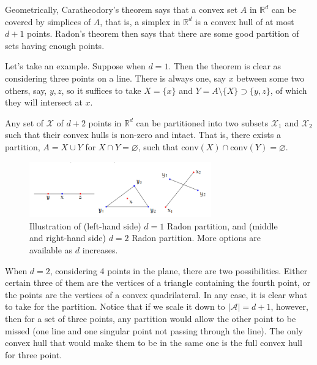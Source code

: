 Geometrically, Caratheodory's theorem says that a convex set $A$ in $\mathbb{R}^{d}$ can be covered by simplices of $A$, that is, a simplex in $\mathbb{R}^{d}$ is a convex hull of at most $d+1$ points. Radon's theorem then says that there are some good partition of sets having enough points. 

Let's take an example. Suppose when $d=1$. Then the theorem is clear as considering three points on a line. There is always one, say $x$ between some two others, say, $y,z$, so it suffices to take $X=\{x\}$ and $Y=A\setminus \{X\}\supset \{y,z\}$, of which they will intersect at $x$. 
\begin{theorem}
    Any set of $\mathcal{X}$ of $d+2$ points in $\mathbb{R}^{d}$ can be partitioned into two subsets $\mathcal{X}_{1}$ and $\mathcal{X}_{2}$ such that their convex hulls is non-zero and intact. That is, there exists a partition, $A= X\cup Y$ for $X\cap Y = \varnothing$, such that $\mathrm{conv}(X)\cap \mathrm{conv}(Y)=\varnothing$. 
\end{theorem}
\begin{figure}[htb]
    \centering
    \includegraphics[width=0.7\textwidth]{img/partition_radon.png}
    \caption{Illustration of (left-hand side) $d=1$ Radon partition, and (middle and right-hand side) $d=2$ Radon partition. More options are available as $d$ increases.}
\end{figure}
When $d=2$, considering 4 points in the plane, there are two possibilities. Either certain three of them are the vertices of a triangle containing the fourth point, or the points are the vertices of a convex quadrilateral. In any case, it is clear what to take for the partition. Notice that if we scale it down to $\lvert \mathcal{A}\rvert = d+1$, however, then for a set of three points, any partition would allow the other point to be missed (one line and one singular point not passing through the line). The only convex hull that would make them to be in the same one is the full convex hull for three point. 

